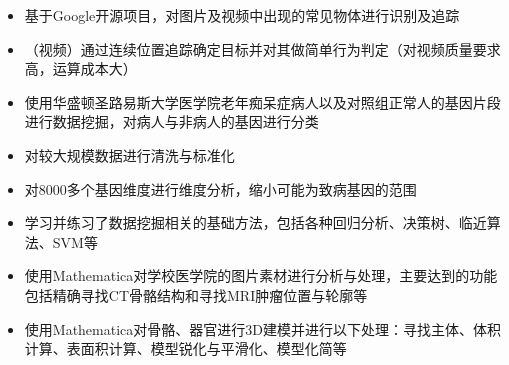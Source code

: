 \documentclass[9pt,a4paper]{altacv}
\begin{document}
%
%
%
%
%
%
\begin{fullwidth}
	
	
	\begin{multicols}{2}
		
		\begin{itemize}
			\item 基于Google开源项目，对图片及视频中出现的常见物体进行识别及追踪
			\item （视频）通过连续位置追踪确定目标并对其做简单行为判定（对视频质量要求高，运算成本大）
		\end{itemize}
		
		\divider
		
		\begin{itemize}
			\item 使用华盛顿圣路易斯大学医学院老年痴呆症病人以及对照组正常人的基因片段进行数据挖掘，对病人与非病人的基因进行分类
			\item 对较大规模数据进行清洗与标准化
			\item 对8000多个基因维度进行维度分析，缩小可能为致病基因的范围
			\item 学习并练习了数据挖掘相关的基础方法，包括各种回归分析、决策树、临近算法、SVM等
		\end{itemize}
		
		\divider
		
		\begin{itemize}
			\item 使用Mathematica对学校医学院的图片素材进行分析与处理，主要达到的功能包括精确寻找CT骨骼结构和寻找MRI肿瘤位置与轮廓等
			\item 使用Mathematica对骨骼、器官进行3D建模并进行以下处理：寻找主体、体积计算、表面积计算、模型锐化与平滑化、模型化简等
		\end{itemize}
		

\end{multicols}
\end{fullwidth}
\end{document}
